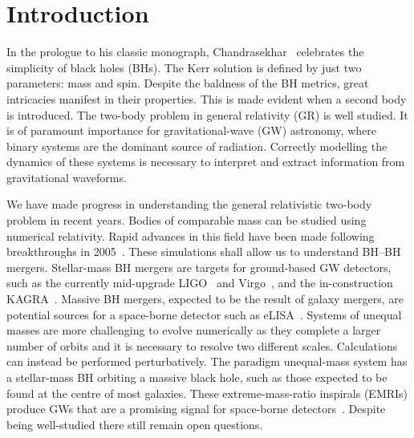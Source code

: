 \documentclass[aps,prd,amsfonts,amssymb,amsmath,nofootinbib,showpacs,superscriptaddress,twocolumn]{revtex4}
\begin{document}
\maketitle

\section{Introduction}

In the prologue to his classic monograph, Chandrasekhar~\cite{Chandrasekhar1992} celebrates the simplicity of black holes (BHs). The Kerr solution is defined by just two parameters: mass and spin. Despite the baldness of the BH metrics, great intricacies manifest in their properties. This is made evident when a second body is introduced. The two-body problem in general relativity (GR) is well studied. It is of paramount importance for gravitational-wave (GW) astronomy, where binary systems are the dominant source of radiation. Correctly modelling the dynamics of these systems is necessary to interpret and extract information from gravitational waveforms.

We have made progress in understanding the general relativistic two-body problem in recent years. Bodies of comparable mass can be studied using numerical relativity. Rapid advances in this field have been made following breakthroughs in 2005~\cite{Pretorius2005,Campanelli2006,Baker2006}. These simulations shall allow us to understand BH--BH mergers. Stellar-mass BH mergers are targets for ground-based GW detectors, such as the currently mid-upgrade LIGO~\cite{Harry2010} and Virgo~\cite{Accadia2011}, and the in-construction KAGRA~\cite{Kuroda2010}. Massive BH mergers, expected to be the result of galaxy mergers, are potential sources for a space-borne detector such as eLISA~\cite{Amaro-Seoane2012a}. Systems of unequal masses are more challenging to evolve numerically as they complete a larger number of orbits and it is necessary to resolve two different scales. Calculations can instead be performed perturbatively. The paradigm unequal-mass system has a stellar-mass BH orbiting a massive black hole, such as those expected to be found at the centre of most galaxies. These extreme-mass-ratio inspirals (EMRIs) produce GWs that are a promising signal for space-borne detectors~\cite{Amaro-Seoane2007}. Despite being well-studied there still remain open questions.
\end{document}
